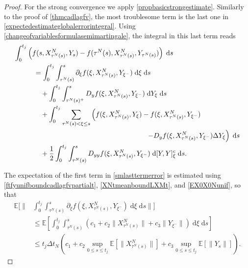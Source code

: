 \documentclass[reqno,12pt]{amsart}
\theoremstyle{plain} %
\theoremstyle{definition} %
\begin{document}
\begin{proof}
    For the strong convergence we apply \cref{propbasicstrongestimate}. Similarly to the proof of \cref{thmcadlagfv}, the most troublesome term is the last one in \eqref{expectedestimateglobalerrorintegral}. Using \eqref{changeofvariablesformulasemimartingale}, the integral in this last term reads
    \begin{equation}
        \label{smlasttermerror}
        \begin{aligned}
            \int_0^{t_j} & \left( f(s, X_{\tau^N(s)}^N, Y_s) - f(\tau^N(s), X_{\tau^N(s)}^N, Y_{\tau^N(s)}) \right)\;\mathrm{d}s \\
            & \quad = \int_0^{t_j} \int_{\tau^N(s)}^s \partial_\xi f(\xi, X_{\tau^N(s)}^N, Y_{\xi^-})\;\mathrm{d}\xi \;\mathrm{d}s \\
            & \qquad + \int_0^{t_j} \int_{\tau^N(s)^+}^s D_y f(\xi, X_{\tau^N(s)}^N, Y_{\xi^-}) \;\mathrm{d}Y_\xi \;\mathrm{d}s \\
            & \qquad + \int_0^{t_j} \sum_{\tau^N(s) < \xi \leq s} \left(f(\xi, X_{\tau^N(s)}^N, Y_\xi) - f(\xi, X_{\tau^N(s)}^N, Y_{\xi^{-}}) \right. \\
            & \hspace{2.4in} \left. - D_y f(\xi, X_{\tau^N(s)}^N, Y_{\xi^-})\Delta Y_\xi\right) \;\mathrm{d}s \\ 
            & \qquad + \frac{1}{2} \int_0^{t_j} \int_{\tau^N(s)}^s D_{yy}f(\xi, X_{\tau^N(s)}^N, Y_{\xi^-})\;\mathrm{d}[Y, Y]_\xi^c\;\mathrm{d}s.
        \end{aligned}
    \end{equation}
    
    The expectation of the first term in \eqref{smlasttermerror} is estimated using \eqref{ftfyunifboundcadlagfvpartialt}, \eqref{XNtmeanboundLXMt}, and \eqref{EX0X0Nunif}, so that
    \begin{equation}
        \label{strongorderterm1}
        \begin{aligned}
            \mathbb{E}\bigg[\bigg\| & \int_0^{t_j} \int_{\tau^N(s)}^s \partial_\xi f(\xi, X_{\tau^N(s)}^N, Y_{\xi^-})\;\mathrm{d}\xi\;\mathrm{d}s\bigg\|\bigg] \\
            & \leq \mathbb{E}\left[\int_0^{t_j} \int_{\tau^N(s)}^s \left(c_1 + c_2 \|X_{\tau^N(s)}^N\| + c_3\|Y_{\xi^-}\|\right)\;\mathrm{d}\xi\;\mathrm{d}s\right] \\
            & \leq t_j \Delta t_N \left(c_1 + c_2 \sup_{0\leq s \leq t_j} \mathbb{E}\left[\|X_{\tau^N(s)}^N\|\right] + c_3\sup_{0 \leq s \leq t_j}\mathbb{E}\left[\|Y_s\|\right]\right).
        \end{aligned}
    \end{equation}


\end{proof}
\end{document}
